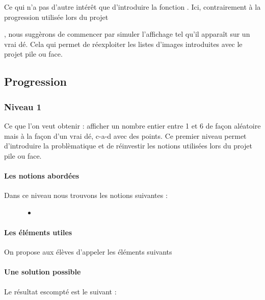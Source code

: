 \documentclass[letterpaper,10pt,french]{sphinxmanual}
\begin{document}
Ce qui n’a pas d’autre intérêt que d’introduire la fonction
.
Ici, contrairement à la progression utilisée lors du projet

, nous suggèrons de commencer par simuler l’affichage tel
qu’il apparaît sur un vrai dé.
Cela qui permet de réexploiter les listes d’images
introduites avec le projet pile ou face.


\subsection{Progression}
\label{\detokenize{decouverte/de6faces-python:id1}}

\subsubsection{Niveau 1}
\label{\detokenize{decouverte/de6faces-python1:niveau-1}}\label{\detokenize{decouverte/de6faces-python1::doc}}
Ce que l’on veut obtenir : afficher  un nombre entier entre 1 et 6 de façon aléatoire mais
à la façon d’un vrai dé, c-a-d avec des points.
Ce premier niveau permet d’introduire la problèmatique et de réinvestir les notions
utilisées lors du projet pile ou face.


\paragraph{Les notions abordées}
\label{\detokenize{decouverte/de6faces-python1:les-notions-abordees}}\begin{description}
\item[{Dans ce niveau nous trouvons les notions suivantes :}] \leavevmode\begin{itemize}
\item {} 
\end{itemize}

\end{description}


\paragraph{Les éléments utiles}
\label{\detokenize{decouverte/de6faces-python1:les-elements-utiles}}
On propose aux élèves d’appeler les éléments suivants


\paragraph{Une solution possible}
\label{\detokenize{decouverte/de6faces-python1:une-solution-possible}}
Le résultat escompté est le suivant :
\end{document}
